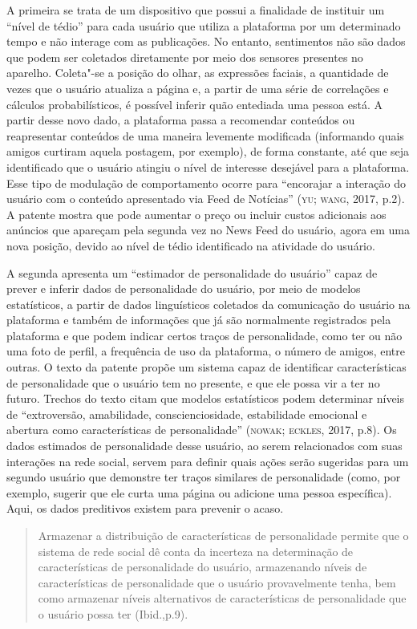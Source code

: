 A primeira se trata de um dispositivo que possui a finalidade de
instituir um ``nível de tédio'' para cada usuário que utiliza a
plataforma por um determinado tempo e não interage com as publicações.
No entanto, sentimentos não são dados que podem ser coletados
diretamente por meio dos sensores presentes no aparelho. Coleta"-se a
posição do olhar, as expressões faciais, a quantidade de vezes que o
usuário atualiza a página e, a partir de uma série de correlações e
cálculos probabilísticos, é possível inferir quão entediada uma pessoa
está. A partir desse novo dado, a plataforma passa a recomendar
conteúdos ou reapresentar conteúdos de uma maneira levemente modificada
(informando quais amigos curtiram aquela postagem, por exemplo), de
forma constante, até que seja identificado que o usuário atingiu o nível
de interesse desejável para a plataforma. Esse tipo de modulação de
comportamento ocorre para ``encorajar a interação do usuário com o
conteúdo apresentado via Feed de Notícias'' (\textsc{yu; wang}, 2017, p.2). A
patente mostra que pode aumentar o preço ou incluir custos adicionais
aos anúncios que apareçam pela segunda vez no News Feed do usuário,
agora em uma nova posição, devido ao nível de tédio identificado na
atividade do usuário.

A segunda apresenta um ``estimador de personalidade do usuário'' capaz
de prever e inferir dados de personalidade do usuário, por meio de
modelos estatísticos, a partir de dados linguísticos coletados da
comunicação do usuário na plataforma e também de informações que já são
normalmente registrados pela plataforma e que podem indicar certos
traços de personalidade, como ter ou não uma foto de perfil, a
frequência de uso da plataforma, o número de amigos, entre outras. O
texto da patente propõe um sistema capaz de identificar características
de personalidade que o usuário tem no presente, e que ele possa vir a
ter no futuro. Trechos do texto citam que modelos estatísticos podem
determinar níveis de ``extroversão, amabilidade, conscienciosidade,
estabilidade emocional e abertura como características de
personalidade'' (\textsc{nowak; eckles}, 2017, p.8). Os dados estimados de
personalidade desse usuário, ao serem relacionados com suas interações
na rede social, servem para definir quais ações serão sugeridas para um
segundo usuário que demonstre ter traços similares de personalidade
(como, por exemplo, sugerir que ele curta uma página ou adicione uma
pessoa específica). Aqui, os dados preditivos existem para prevenir o
acaso.

\begin{quote}
Armazenar a distribuição de características de personalidade permite que
o sistema de rede social dê conta da incerteza na determinação de
características de personalidade do usuário, armazenando níveis de
características de personalidade que o usuário provavelmente tenha, bem
como armazenar níveis alternativos de características de personalidade
que o usuário possa ter (Ibid.,p.9).
\end{quote}

